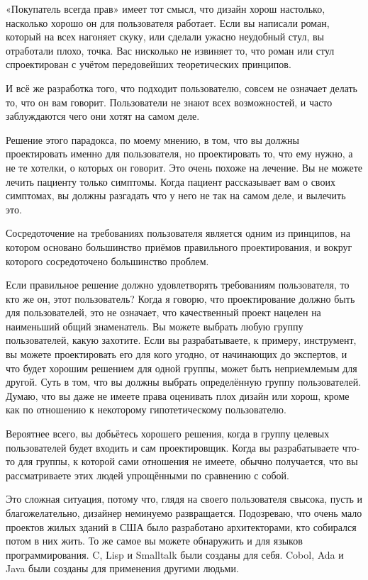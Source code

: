 \documentclass[ebook,12pt,oneside,openany]{memoir}
\begin{document}
«Покупатель всегда прав» имеет тот смысл, что дизайн хорош настолько,
насколько хорошо он для пользователя работает. Если вы написали роман,
который на всех нагоняет скуку, или сделали ужасно неудобный стул, вы
отработали плохо, точка. Вас нисколько не извиняет то, что роман или
стул спроектирован с учётом передовейших теоретических принципов.

И всё же разработка того, что подходит пользователю, совсем не
означает делать то, что он вам говорит. Пользователи не знают всех
возможностей, и часто заблуждаются чего они хотят на самом деле.

Решение этого парадокса, по моему мнению, в том, что вы должны
проектировать именно для пользователя, но проектировать то, что ему
нужно, а не те хотелки, о которых он говорит. Это очень похоже на
лечение. Вы не можете лечить пациенту только симптомы. Когда пациент
рассказывает вам о своих симптомах, вы должны разгадать что у него не
так на самом деле, и вылечить это.

Сосредоточение на требованиях пользователя является одним из
принципов, на котором основано большинство приёмов правильного
проектирования, и вокруг которого сосредоточено большинство проблем.

Если правильное решение должно удовлетворять требованиям пользователя,
то кто же он, этот пользователь? Когда я говорю, что проектирование
должно быть для пользователей, это не означает, что качественный
проект нацелен на наименьший общий знаменатель. Вы можете выбрать
любую группу пользователей, какую захотите. Если вы разрабатываете, к
примеру, инструмент, вы можете проектировать его для кого угодно, от
начинающих до экспертов, и что будет хорошим решением для одной
группы, может быть неприемлемым для другой. Суть в том, что вы должны
выбрать определённую группу пользователей. Думаю, что вы даже не
имеете права оценивать плох дизайн или хорош, кроме как по отношению к
некоторому гипотетическому пользователю.

Вероятнее всего, вы добьётесь хорошего решения, когда в группу целевых
пользователей будет входить и сам проектировщик. Когда вы
разрабатываете что-то для группы, к которой сами отношения не имеете,
обычно получается, что вы рассматриваете этих людей упрощёнными по
сравнению с собой.

Это сложная ситуация, потому что, глядя на своего пользователя
свысока, пусть и благожелательно, дизайнер неминуемо развращается.
Подозреваю, что очень мало проектов жилых зданий в США было
разработано архитекторами, кто собирался потом в них жить. То же самое
вы можете обнаружить и для языков программирования. C, Lisp и
Smalltalk были созданы для себя. Cobol, Ada и Java были созданы для
применения другими людьми.
\end{document}
